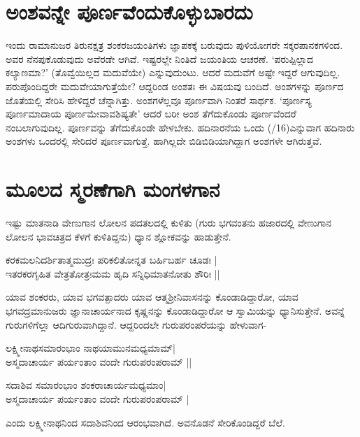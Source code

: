 \section*{ಅಂಶವನ್ನೇ ಪೂರ್ಣವೆಂದುಕೊಳ್ಳುಬಾರದು}

ಇಂದು ರಾಮಾನುಜರ ತಿರುನಕ್ಷತ್ರ ಶಂಕರಜಯಂತಿಗಳು ಜ್ಞಾಪಕಕ್ಕೆ ಬರುವುದು ಪುಳಿಯೋಗರೇ ಸಕ್ಕರಪಾನಕಗಳಿಂದ. ಅವರ ನೆನಪುಕೊಡುವುದು ಅವೆರಡೇ ಆಗಿವೆ. ಇಷ್ಟರಲ್ಲೇ ನಿಂತಿದೆ ಜಯಂತಿಯ ಆಚರಣೆ. `ಪರುಪ್ಪಿಲ್ಲಾದ ಕಲ್ಯಾಣಮಾ?' (ತೊವ್ವೆಯಿಲ್ಲದ ಮದುವೆಯೇ) ಎನ್ನುವುದುಂಟು. ಆದರೆ ಮದುವೆಗೆ ಅಷ್ಟೇ ಇದ್ದರೆ ಆಗುವುದಿಲ್ಲ. ಪರುಪೊಂದಿದ್ದರೇ ಮದುವೇಯಾಗುತ್ತೆಯೇ? ಆದ್ದರಿಂಡ ಅಂಶತಃ ಈ ವಿಷಯವು ಬಂದಿದೆ. ಅಂಶಗಳನ್ನು  ಪೂರ್ಣದ ಜೊತೆಯಲ್ಲಿ ಸೇರಿಸಿ ಹೇಳಿದ್ದರೆ ಚೆನ್ನಾಗಿತ್ತು. ಅಂಶಗಳೆಲ್ಲವೂ ಪೂರ್ಣವಾಗಿ ನಿಂತರೆ ಸಾರ್ಥಕ. `ಪೂರ್ಣಸ್ಯ ಪೂರ್ಣಮಾದಾಯ\label{48a} ಪೂರ್ಣಮೇವಾವಶಿಷ್ಯತೇ' ಆದರೆ ಬರೀ ಅಂಶ ತೆಗೆದುಕೊಂಡು ಪೂರ್ಣವೆಂದರೆ ನಂಬಲಾಗುವುದಿಲ್ಲ. ಪೂರ್ಣವನ್ನು ತೆಗೆದುಕೊಂಡೇ ಹೇಳಬೇಕು. ಹದಿನಾರನೆಯ ಒಂದು {(/16)}ಎನ್ನುವಾಗ ಹದಿನಾರು ಅಂಶಗಳು ಒಂದರಲ್ಲಿ ಸೇರಿದರೆ ಪೂರ್ಣವಾಗುತ್ತೆ. ಹಾಗಿಲ್ಲದೇ ಬಿಡಿಬಿಡಿಯಾಗಿದ್ದಾಗ ಅಂಶಗಳೇ ಆಗಿರುತ್ತವೆ.

\section*{ಮೂಲದ ಸ್ಮರಣೆಗಾಗಿ ಮಂಗಳಗಾನ}

ಇಷ್ಟು ಮಾತನಾಡಿ ವೇಣುಗಾನ ಲೋಲನ ಪದತಲದಲ್ಲಿ ಕುಳಿತು (ಗುರು ಭಗವಂತನು ಹಜಾರದಲ್ಲಿ ವೇಣುಗಾನ ಲೋಲನ ಭಾವಚಿತ್ರದ ಕೆಳಗೆ ಕುಳಿತಿದ್ದನು) ಧ್ಯಾನ ಶ್ಲೋಕವನ್ನು ಹಾಡುತ್ತೇನೆ.

\begin{shloka}
ಕರಕಮಲನಿದರ್ಶಿತಾತ್ಮಮುದ್ರಃ ಪರಿಕಲಿತೋನ್ನತ ಬರ್ಹಿಬರ್ಹ ಚೂಡಃ |\label{48}\\%
ಇತರಕರಗೃಹಿತ ವೇತ್ರತೋತ್ರಃಮಮ ಹೃದಿ ಸನ್ನಿಧಿಮಾತನೋತು ಶೌರಿಃ ||
\end{shloka}

ಯಾವ ಶಂಕರರು, ಯಾವ ಭಗವತ್ಪಾದರು ಯಾವ ಆತ್ಮಶ್ರೀನಿವಾಸನನ್ನು ಕೊಂಡಾಡಿದ್ದಾರೋ, ಯಾವ ಭಗವದ್ರಮಾನುಜರು ಜ್ಞಾನಾಚಾರ್ಯನಾದ ಕೃಷ್ಣನನ್ನು ಕೊಂಡಾಡಿದ್ದಾರೋ ಆ ಸ್ವಾಮಿಯನ್ನು ಧ್ಯಾನಿಸುತ್ತೇನೆ. ಅವನ್ನೆ ಗುರುಗಳಿಗೆಲ್ಲಾ ಆದಿಗುರುವಾಗಿದ್ದಾನೆ. ಆದ್ದರಿಂದಲೇ ಗುರುಪರಂಪರೆಯನ್ನು ಹೇಳುವಾಗ-

\begin{shloka}
ಲಕ್ಷ್ಮೀನಾಥಸಮಾರಂಭಾಂ ನಾಥಯಾಮುನಮಧ್ಯಮಾಮ್|\label{48b}\\
ಅಸ್ಮದಾಚಾರ್ಯ ಪರ್ಯಂತಾಂ ವಂದೇ ಗುರುಪರಂಪರಾಮ್ ||
\end{shloka}

\begin{shloka}
ಸದಾಶಿವ ಸಮಾರಂಭಾಂ ಶಂಕರಾಚಾರ್ಯಮಧ್ಯಮಾಂ|\label{48c}\\
ಅಸ್ಮದಾಚಾರ್ಯ ಪರ್ಯಂತಾಂ ವಂದೇ ಗುರುಪರಂಪರಾಮ್ |
\end{shloka}
ಎಂದು ಲಕ್ಷ್ಮೀನಾಥನಿಂದ ಸದಾಶಿವನಿಂದ ಆರಂಭವಾಗಿದೆ. ಅವನೊಡನೆ ಸೇರಿಕೊಂಡಿದ್ದರೆ ಬೆಲೆ.

